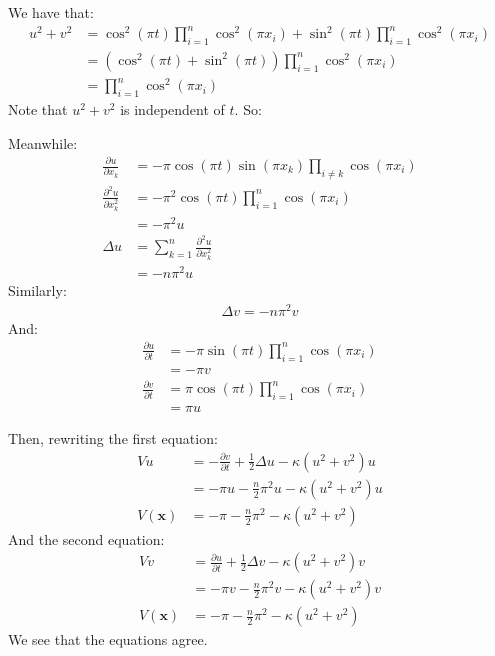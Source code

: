 \documentclass{article}
\newcommand{\bvec}[1]{\boldsymbol{#1}}
\begin{document}
We have that:
\begin{align*}
    u^2 + v^2
        & = \cos^2(\pi t) \prod_{i = 1}^n \cos^2(\pi x_i)
            + \sin^2(\pi t) \prod_{i = 1}^n \cos^2(\pi x_i) \\
        & = (\cos^2(\pi t) + \sin^2(\pi t)) \prod_{i = 1}^n \cos^2(\pi x_i) \\
        & = \prod_{i = 1}^n \cos^2(\pi x_i)
\end{align*}
\noindent Note that $u^2 + v^2$ is independent of $t$. So:

Meanwhile:
\begin{align*}
    \frac{\partial u}{\partial x_k} & = -\pi \cos(\pi t) \sin(\pi x_k) \prod_{i \neq k} \cos(\pi x_i) \\
    \frac{\partial^2 u}{\partial x_k^2} & = -\pi^2 \cos(\pi t) \prod_{i = 1}^n \cos(\pi x_i) \\
        & = -\pi^2 u \\
    \Delta u & = \sum_{k = 1}^n \frac{\partial^2 u}{\partial x_k^2} \\
        & = -n \pi^2 u
\end{align*}
\noindent Similarly:
\begin{align*}
    \Delta v = -n \pi^2 v
\end{align*}
\noindent And:
\begin{align*}
    \frac{\partial u}{\partial t} & = -\pi \sin(\pi t) \prod_{i = 1}^n \cos(\pi x_i) \\
        & = -\pi v \\
    \frac{\partial v}{\partial t} & = \pi \cos(\pi t) \prod_{i = 1}^n \cos(\pi x_i) \\
        & = \pi u
\end{align*}

Then, rewriting the first equation:
\begin{align*}
    V u & = -\frac{\partial v}{\partial t} + \frac{1}{2} \Delta u - \kappa (u^2 + v^2) u \\
        & = -\pi u - \frac{n}{2} \pi^2 u - \kappa (u^2 + v^2) u \\
    V(\bvec{x}) & = -\pi - \frac{n}{2} \pi^2 - \kappa (u^2 + v^2)
\end{align*}
\noindent And the second equation:
\begin{align*}
    V v & = \frac{\partial u}{\partial t} + \frac{1}{2} \Delta v - \kappa (u^2 + v^2) v \\
        & = -\pi v - \frac{n}{2} \pi^2 v - \kappa (u^2 + v^2) v \\
    V(\bvec{x}) & = -\pi - \frac{n}{2} \pi^2 - \kappa (u^2 + v^2)
\end{align*}
\noindent We see that the equations agree.
\end{document}

